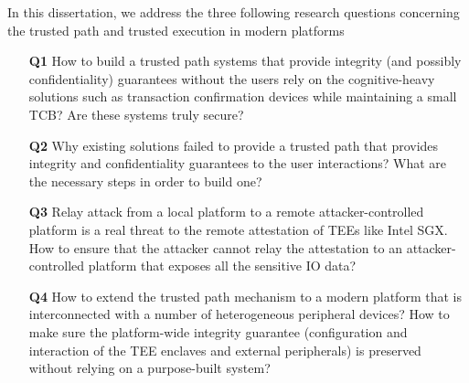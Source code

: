 In this dissertation, we address the three following research questions concerning the trusted path and trusted execution in modern platforms 
\begin{enumerate}
  
  	\item[\textbf{Q1}] How to build a trusted path systems that provide integrity (and possibly confidentiality) guarantees without the users rely on the cognitive-heavy solutions such as transaction confirmation devices while maintaining a small TCB? Are these systems truly secure?
  	
    \item[\textbf{Q2}] Why existing solutions failed to provide a trusted path that provides integrity and confidentiality guarantees to the user interactions? What are the necessary steps in order to build one?
    
    \item[\textbf{Q3}] Relay attack from a local platform to a remote attacker-controlled platform is a real threat to the remote attestation of TEEs like Intel SGX. How to ensure that the attacker cannot relay the attestation to an attacker-controlled platform that exposes all the sensitive IO data?
    
    \item[\textbf{Q4}] How to extend the trusted path mechanism to a modern platform that is interconnected with a number of heterogeneous peripheral devices? How to make sure the platform-wide integrity guarantee (configuration and interaction of the TEE enclaves and external peripherals) is preserved without relying on a purpose-built system?  
\end{enumerate}

